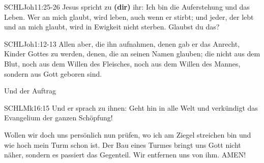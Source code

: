 \documentclass[fontsize=16pt]{mybib}
\begin{document}
    \begin{bibelbox}{SCHL}{Joh}{11:25-26}
        Jesus spricht zu \textbf{(dir)} ihr: Ich bin die Auferstehung und das Leben. Wer an mich glaubt, wird leben, auch wenn er stirbt; und jeder, der lebt und an mich glaubt, wird in Ewigkeit nicht sterben. Glaubst du das?
    \end{bibelbox} 
    \begin{bibelbox}{SCHL}{Joh}{1:12-13}
        Allen aber, die ihn aufnahmen, denen gab er das Anrecht, Kinder Gottes zu werden, denen, die an seinen Namen glauben;
        die nicht aus dem Blut, noch aus dem Willen des Fleisches, noch aus dem Willen des Mannes, sondern aus Gott geboren sind.
    \end{bibelbox}     
    Und der Auftrag
    \begin{bibelbox}{SCHL}{Mk}{16:15}
        Und er sprach zu ihnen: Geht hin in alle Welt und verkündigt das Evangelium der ganzen Schöpfung!
    \end{bibelbox} 
    Wollen wir doch uns persönlich nun prüfen, wo ich am Ziegel streichen bin und wie hoch mein Turm schon ist. Der Bau eines Turmes bringt uns Gott nicht näher, sondern es passiert das Gegenteil. Wir entfernen uns von ihm. AMEN!
    
    \beten{}   
    
\end{document}
